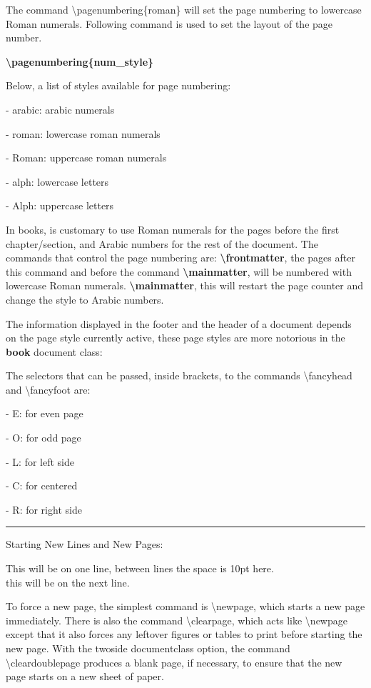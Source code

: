 \documentclass[12pt,openright]{book}
\begin{document}
The command \textbackslash pagenumbering\{roman\} will set the page numbering to lowercase Roman numerals. Following command is used to set the layout of the page number.

\textbf{\textbackslash pagenumbering\{num\_style\}}

Below, a list of styles available for page numbering:

- arabic: arabic numerals

- roman: lowercase roman numerals

- Roman: uppercase roman numerals

- alph: lowercase letters

- Alph: uppercase letters

In books, is customary to use Roman numerals for the pages before the first chapter/section, and Arabic numbers for the rest of the document. The commands that control the page numbering are: \textbf{\textbackslash frontmatter}, the pages after this command and before the command \textbf{\textbackslash mainmatter}, will be numbered with lowercase Roman numerals. \textbf{\textbackslash mainmatter}, this will restart the page counter and change the style to Arabic numbers.

The information displayed in the footer and the header of a document depends on the page style currently active, these page styles are more notorious in the \textbf{book} document class:

The selectors that can be passed, inside brackets, to the commands \textbackslash fancyhead and \textbackslash fancyfoot are:

- E: for even page

- O: for odd page

- L: for left side

- C: for centered

- R: for right side

\vskip 0.05in
\rule{\textwidth}{0.5pt}
\vskip 0.05in

Starting New Lines and New Pages:

This will be on one line, between lines the space is 10pt here. \\[10pt] this will be on the next line. 

To force a new page, the simplest command is \textbackslash newpage, which starts a new page immediately. There is also the command \textbackslash clearpage, which acts like \textbackslash newpage except that it also forces any leftover figures or tables to print before starting the new page. With the twoside documentclass option, the command \textbackslash cleardoublepage produces a blank page, if necessary, to ensure that the new page starts on a new sheet of paper.
\end{document}
